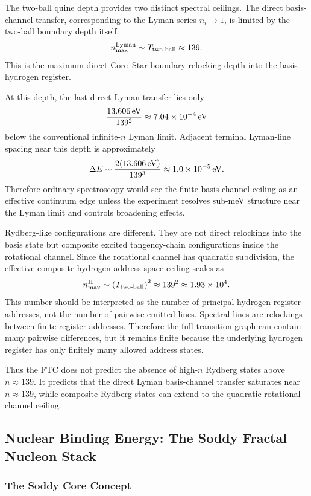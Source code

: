 \documentclass[11pt,a4paper]{article}
\begin{document}
The two-ball quine depth provides two distinct spectral ceilings. The direct basis-channel transfer, corresponding to the Lyman series \(n_i\to1\), is limited by the two-ball boundary depth itself:
\[
n_{\max}^{\rm Lyman}
\sim
T_{\rm two\text{-}ball}
\approx139.
\]
This is the maximum direct Core--Star boundary relocking depth into the basis hydrogen register.

At this depth, the last direct Lyman transfer lies only
\[
\frac{13.606\,{\rm eV}}{139^2}
\approx
7.04\times10^{-4}\,{\rm eV}
\]
below the conventional infinite-\(n\) Lyman limit. Adjacent terminal Lyman-line spacing near this depth is approximately
\[
\Delta E
\sim
\frac{2(13.606\,{\rm eV})}{139^3}
\approx
1.0\times10^{-5}\,{\rm eV}.
\]
Therefore ordinary spectroscopy would see the finite basis-channel ceiling as an effective continuum edge unless the experiment resolves sub-meV structure near the Lyman limit and controls broadening effects.

Rydberg-like configurations are different. They are not direct relockings into the basis state but composite excited tangency-chain configurations inside the rotational channel. Since the rotational channel has quadratic subdivision, the effective composite hydrogen address-space ceiling scales as
\[
n_{\max}^{\rm H}
\sim
\left(T_{\rm two\text{-}ball}\right)^2
\approx
139^2
\approx
1.93\times10^4.
\]
This number should be interpreted as the number of principal hydrogen register addresses, not the number of pairwise emitted lines. Spectral lines are relockings between finite register addresses. Therefore the full transition graph can contain many pairwise differences, but it remains finite because the underlying hydrogen register has only finitely many allowed address states.

Thus the FTC does not predict the absence of high-\(n\) Rydberg states above \(n\approx139\). It predicts that the direct Lyman basis-channel transfer saturates near \(n\approx139\), while composite Rydberg states can extend to the quadratic rotational-channel ceiling.


\subsection{Nuclear Binding Energy: The Soddy Fractal Nucleon Stack}

  \subsubsection{The Soddy Core Concept}
\end{document}
